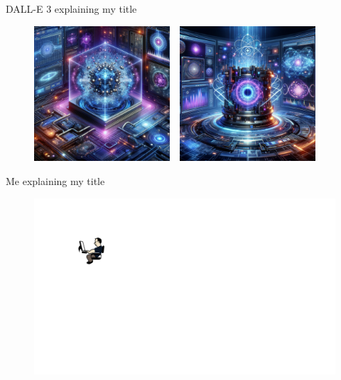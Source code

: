 \documentclass[8pt, xcolor={svgnames}, hyperref={linkcolor=black}]{beamer}
\begin{document}
\begin{frame}{DALL-E 3 explaining my title}
\begin{figure}  
    \includegraphics[width=0.45\textwidth]{figures/dalleplus1.png}%
    $\,\,$
    \includegraphics[width=0.45\textwidth]{figures/dalleplus2.png}%
\end{figure}
\end{frame}

\begin{frame}{Me explaining my title}
\pause
\begin{figure}  
    \includegraphics[width=1\textwidth]{figures/justme.png}
\end{figure}
\end{frame}
\end{document}
